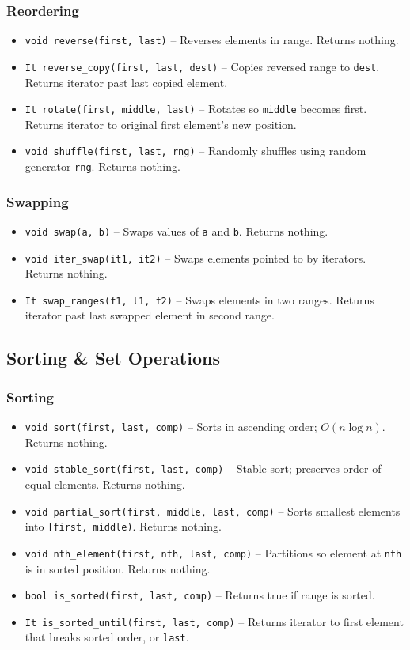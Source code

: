 \subsubsection{Reordering}
\begin{itemize}
\item \texttt{void reverse(first, last)} -- Reverses elements in range. Returns nothing.
\item \texttt{It reverse\_copy(first, last, dest)} -- Copies reversed range to \texttt{dest}. Returns iterator past last copied element.
\item \texttt{It rotate(first, middle, last)} -- Rotates so \texttt{middle} becomes first. Returns iterator to original first element's new position.
\item \texttt{void shuffle(first, last, rng)} -- Randomly shuffles using random generator \texttt{rng}. Returns nothing.
\end{itemize}

\subsubsection{Swapping}
\begin{itemize}
\item \texttt{void swap(a, b)} -- Swaps values of \texttt{a} and \texttt{b}. Returns nothing.
\item \texttt{void iter\_swap(it1, it2)} -- Swaps elements pointed to by iterators. Returns nothing.
\item \texttt{It swap\_ranges(f1, l1, f2)} -- Swaps elements in two ranges. Returns iterator past last swapped element in second range.
\end{itemize}


\subsection{Sorting \& Set Operations}

\subsubsection{Sorting}
\begin{itemize}
\item \texttt{void sort(first, last, comp)} -- Sorts in ascending order; $O(n \log n)$. Returns nothing.
\item \texttt{void stable\_sort(first, last, comp)} -- Stable sort; preserves order of equal elements. Returns nothing.
\item \texttt{void partial\_sort(first, middle, last, comp)} -- Sorts smallest elements into \texttt{[first, middle)}. Returns nothing.
\item \texttt{void nth\_element(first, nth, last, comp)} -- Partitions so element at \texttt{nth} is in sorted position. Returns nothing.
\item \texttt{bool is\_sorted(first, last, comp)} -- Returns true if range is sorted.
\item \texttt{It is\_sorted\_until(first, last, comp)} -- Returns iterator to first element that breaks sorted order, or \texttt{last}.
\end{itemize}

